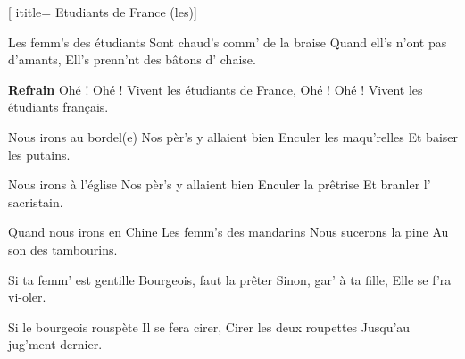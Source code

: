  [
ititle= {Etudiants de France (les)}]

\beginverse
Les femm's des étudiants
Sont chaud's comm' de la braise
Quand ell's n'ont pas d'amants,
Ell's prenn'nt des bâtons d' chaise.
\endverse

\beginchorus
\textbf {Refrain}
Ohé ! Ohé ! Vivent les étudiants de France,
Ohé ! Ohé ! Vivent les étudiants français.
\endchorus

\beginverse
Nous irons au bordel(e)
Nos pèr's y allaient bien
Enculer les maqu'relles
Et baiser les putains.
\endverse

\beginverse
Nous irons à l'église
Nos pèr's y allaient bien
Enculer la prêtrise
Et branler l' sacristain.
\endverse

\beginverse
Quand nous irons en Chine
Les femm's des mandarins
Nous sucerons la pine
Au son des tambourins.
\endverse

\beginverse
Si ta femm' est gentille
Bourgeois, faut la prêter
Sinon, gar' à ta fille,
Elle se f'ra vi-oler.
\endverse

\beginverse
Si le bourgeois rouspète
Il se fera cirer,
Cirer les deux roupettes
Jusqu'au jug'ment dernier.
\endverse

\endsong